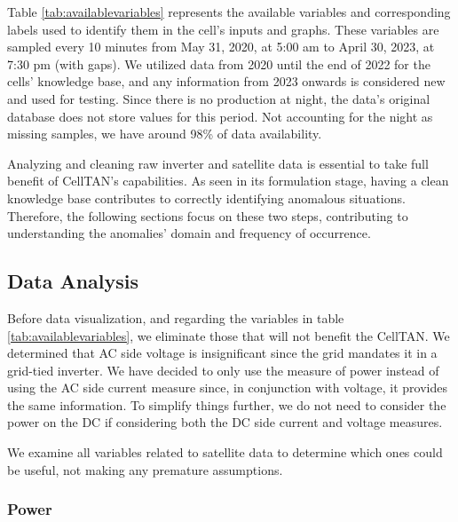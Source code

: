 Table \ref{tab:availablevariables} represents the available variables and corresponding labels used to identify them in the cell's inputs and graphs. These variables are sampled every 10 minutes from May 31, 2020, at 5:00 am to April 30, 2023, at 7:30 pm (with gaps). We utilized data from 2020 until the end of 2022 for the cells' knowledge base, and any information from 2023 onwards is considered new and used for testing. Since there is no production at night, the data's original database does not store values for this period. Not accounting for the night as missing samples, we have around 98\% of data availability.

Analyzing and cleaning raw inverter and satellite data is essential to take full benefit of CellTAN's capabilities. As seen in its formulation stage, having a clean knowledge base contributes to correctly identifying anomalous situations. Therefore, the following sections focus on these two steps, contributing to understanding the anomalies' domain and frequency of occurrence.

\subsection{Data Analysis}  \label{subsec:eda}

Before data visualization, and regarding the variables in table \ref{tab:availablevariables}, we eliminate those that will not benefit the CellTAN. We determined that AC side voltage is insignificant since the grid mandates it in a grid-tied inverter. We have decided to only use the measure of power instead of using the AC side current measure since, in conjunction with voltage, it provides the same information. To simplify things further, we do not need to consider the power on the DC if considering both the DC side current and voltage measures.

We examine all variables related to satellite data to determine which ones could be useful, not making any premature assumptions.

\subsubsection{Power}



